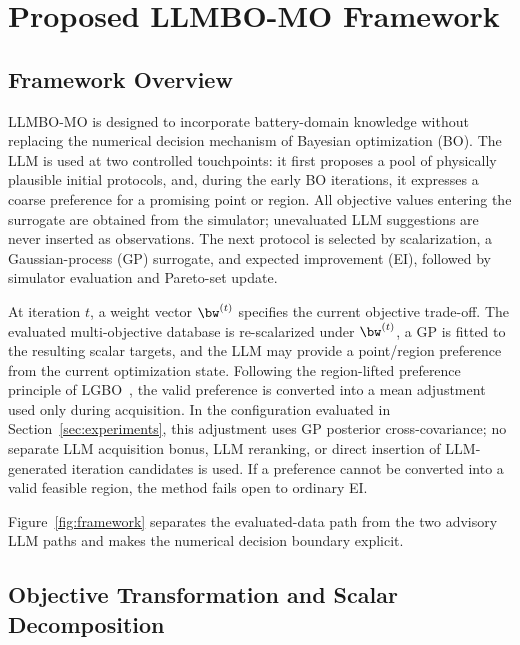 \section{Proposed LLMBO-MO Framework}
\label{sec:method}

\subsection{Framework Overview}

LLMBO-MO is designed to incorporate battery-domain knowledge without replacing
the numerical decision mechanism of Bayesian optimization (BO). The LLM is used
at two controlled touchpoints: it first proposes a pool of physically plausible
initial protocols, and, during the early BO iterations, it expresses a coarse
preference for a promising point or region. All objective values entering the
surrogate are obtained from the simulator; unevaluated LLM suggestions are
never inserted as observations. The next protocol is selected by scalarization,
a Gaussian-process (GP) surrogate, and expected improvement (EI), followed by
simulator evaluation and Pareto-set update.

At iteration $t$, a weight vector $\bw^{(t)}$ specifies the current objective
trade-off. The evaluated multi-objective database is re-scalarized under
$\bw^{(t)}$, a GP is fitted to the resulting scalar targets, and the LLM may
provide a point/region preference from the current optimization state. Following
the region-lifted preference principle of LGBO~\cite{ref16}, the valid
preference is converted into a mean adjustment used only during acquisition.
In the configuration evaluated in Section~\ref{sec:experiments}, this adjustment
uses GP posterior cross-covariance; no separate LLM acquisition bonus, LLM
reranking, or direct insertion of LLM-generated iteration candidates is used.
If a preference cannot be converted into a valid feasible region, the method
fails open to ordinary EI.

Figure~\ref{fig:framework} separates the evaluated-data path from the two
advisory LLM paths and makes the numerical decision boundary explicit.


\subsection{Objective Transformation and Scalar Decomposition}

